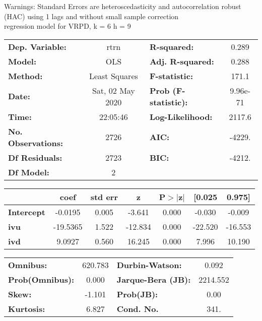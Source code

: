 Warnings: \newline
 [1] Standard Errors are heteroscedasticity and autocorrelation robust (HAC) using 1 lags and without small sample correction\\ 

regression model for VRPD, k = 6 h = 9\begin{center}
\begin{tabular}{lclc}
\toprule
\textbf{Dep. Variable:}    &       rtrn       & \textbf{  R-squared:         } &     0.289   \\
\textbf{Model:}            &       OLS        & \textbf{  Adj. R-squared:    } &     0.288   \\
\textbf{Method:}           &  Least Squares   & \textbf{  F-statistic:       } &     171.1   \\
\textbf{Date:}             & Sat, 02 May 2020 & \textbf{  Prob (F-statistic):} &  9.96e-71   \\
\textbf{Time:}             &     22:05:46     & \textbf{  Log-Likelihood:    } &    2117.6   \\
\textbf{No. Observations:} &        2726      & \textbf{  AIC:               } &    -4229.   \\
\textbf{Df Residuals:}     &        2723      & \textbf{  BIC:               } &    -4212.   \\
\textbf{Df Model:}         &           2      & \textbf{                     } &             \\
\bottomrule
\end{tabular}
\begin{tabular}{lcccccc}
                   & \textbf{coef} & \textbf{std err} & \textbf{z} & \textbf{P$> |$z$|$} & \textbf{[0.025} & \textbf{0.975]}  \\
\midrule
\textbf{Intercept} &      -0.0195  &        0.005     &    -3.641  &         0.000        &       -0.030    &       -0.009     \\
\textbf{ivu}       &     -19.5365  &        1.522     &   -12.834  &         0.000        &      -22.520    &      -16.553     \\
\textbf{ivd}       &       9.0927  &        0.560     &    16.245  &         0.000        &        7.996    &       10.190     \\
\bottomrule
\end{tabular}
\begin{tabular}{lclc}
\textbf{Omnibus:}       & 620.783 & \textbf{  Durbin-Watson:     } &    0.092  \\
\textbf{Prob(Omnibus):} &   0.000 & \textbf{  Jarque-Bera (JB):  } & 2214.552  \\
\textbf{Skew:}          &  -1.101 & \textbf{  Prob(JB):          } &     0.00  \\
\textbf{Kurtosis:}      &   6.827 & \textbf{  Cond. No.          } &     341.  \\
\bottomrule
\end{tabular}
\end{center}

